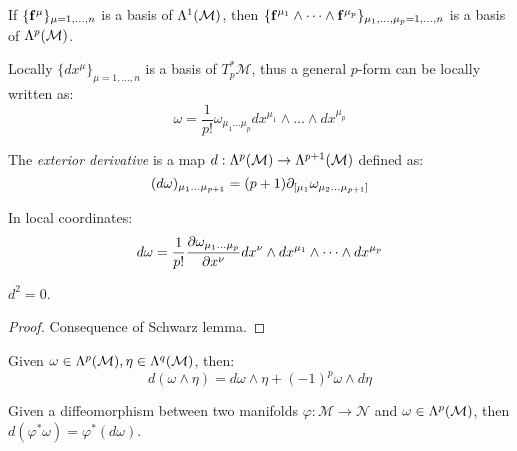 \begin{proposition}
  If $ \{\mathbf{f}^{\mu}\}_{\mu = 1,\dots,n} $ is a basis of $ \Lambda^{1}(\mathcal{M}) $, then 
  $ \{\mathbf{f}^{\mu_1} \wedge \dots \wedge \mathbf{f}^{\mu_p}\}_{\mu_1,\dots,\mu_p = 1,\dots,n} $ is a basis of $ \Lambda^{p}(\mathcal{M}) $.
\end{proposition}

Locally $ \{dx^{\mu}\}_{\mu = 1,\dots,n} $ is a basis of $ T^*_p \mathcal{M} $, thus a general $ p $-form can be locally written as:
\begin{equation}
  \omega = \frac{1}{p!} \omega_{\mu_1 \dots \mu_p} dx^{\mu_1} \wedge \dots \wedge dx^{\mu_p}
  \label{eq:2.35}
\end{equation}

\begin{definition}
  The \textit{exterior derivative} is a map $ d : \Lambda^{p}(\mathcal{M}) \rightarrow \Lambda^{p+1}(\mathcal{M}) $ defined as:
  \begin{equation}
    (d\omega)_{\mu_1 \dots \mu_{p+1}} = (p + 1) \partial_{[\mu_1} \omega_{\mu_2 \dots \mu_{p+1}]}
    \label{eq:2.36}
  \end{equation}
\end{definition}

In local coordinates:
\begin{equation}
  d\omega = \frac{1}{p!} \frac{\partial \omega_{\mu_1 \dots \mu_p}}{\partial x^{\nu}} dx^{\nu} \wedge dx^{\mu_1} \wedge \dots \wedge dx^{\mu_p}
  \label{eq:2.37}
\end{equation}

\begin{theorem}[Poincaré]
  $ d^2 = 0 $.
\end{theorem}
\begin{proof}
  Consequence of Schwarz lemma.
\end{proof}

\begin{proposition}
  Given $ \omega \in \Lambda^{p}(\mathcal{M}), \eta \in \Lambda^{q}(\mathcal{M}) $, then:
  \begin{equation}
    d(\omega \wedge \eta) = d\omega \wedge \eta + (-1)^p \omega \wedge d\eta
    \label{eq:2.38}
  \end{equation}
\end{proposition}

\begin{proposition}
  Given a diffeomorphism between two manifolds $ \varphi: \mathcal{M} \rightarrow \mathcal{N} $ and $ \omega \in\Lambda^{p}(\mathcal{M}) $, then $ d(\varphi^* \omega) = \varphi^* (d\omega) $.
\end{proposition}


